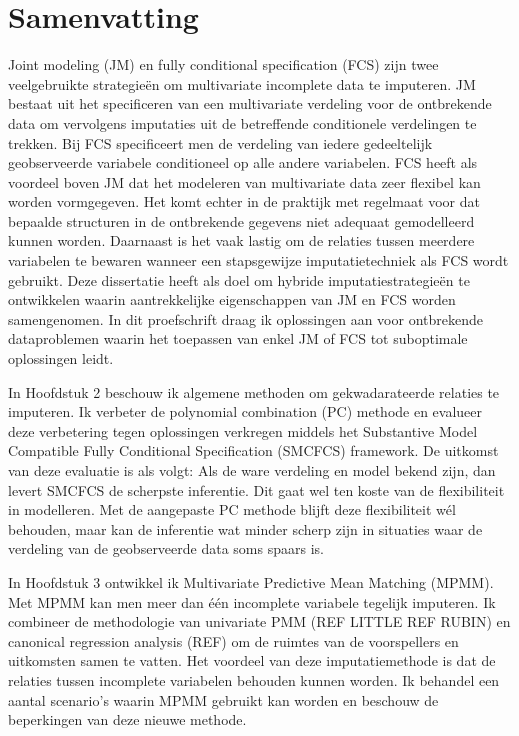 \chapter*{Samenvatting}


Joint modeling (JM) en fully conditional specification (FCS) zijn twee veelgebruikte strategieën om multivariate incomplete data te imputeren. JM bestaat uit het specificeren van een multivariate verdeling voor de ontbrekende data om vervolgens imputaties uit de betreffende conditionele verdelingen te trekken. Bij FCS specificeert men de verdeling van iedere gedeeltelijk geobserveerde variabele conditioneel op alle andere variabelen. FCS heeft als voordeel boven JM dat het modeleren van multivariate data zeer flexibel kan worden vormgegeven. Het komt echter in de praktijk met regelmaat voor dat bepaalde structuren in de ontbrekende gegevens niet adequaat gemodelleerd kunnen worden. Daarnaast is het vaak lastig om de relaties tussen meerdere variabelen te bewaren wanneer een stapsgewijze imputatietechniek als FCS wordt gebruikt. Deze dissertatie heeft als doel om hybride imputatiestrategieën te ontwikkelen waarin aantrekkelijke eigenschappen van JM en FCS worden samengenomen. In dit proefschrift draag ik oplossingen aan voor ontbrekende dataproblemen waarin het toepassen van enkel JM of FCS tot suboptimale oplossingen leidt. 

In Hoofdstuk 2 beschouw ik algemene methoden om gekwadarateerde relaties te imputeren. Ik verbeter de polynomial combination (PC) methode en evalueer deze verbetering tegen oplossingen verkregen middels het Substantive Model Compatible Fully Conditional Specification (SMCFCS) framework. De uitkomst van deze evaluatie is als volgt: Als de ware verdeling en model bekend zijn, dan levert SMCFCS de scherpste inferentie. Dit gaat wel ten koste van de flexibiliteit in modelleren. Met de aangepaste PC methode blijft deze flexibiliteit wél behouden, maar kan de inferentie wat minder scherp zijn in situaties waar de verdeling van de geobserveerde data soms spaars is.

In Hoofdstuk 3 ontwikkel ik Multivariate Predictive Mean Matching (MPMM). Met MPMM kan men meer dan één incomplete variabele tegelijk imputeren. Ik combineer de methodologie van univariate PMM (REF LITTLE REF RUBIN) en canonical regression analysis (REF) om de ruimtes van de voorspellers en uitkomsten samen te vatten. Het voordeel van deze imputatiemethode is dat de relaties tussen incomplete variabelen behouden kunnen worden. Ik behandel een aantal scenario’s waarin MPMM gebruikt kan worden en beschouw de beperkingen van deze nieuwe methode. 

